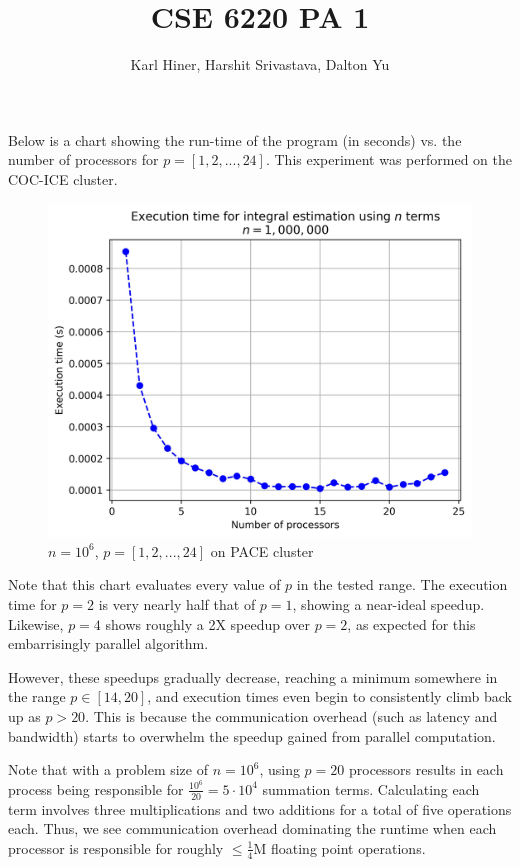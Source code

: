 \documentclass{article}
\begin{document}
\title{CSE 6220 PA 1}
\author{Karl Hiner, Harshit Srivastava, Dalton Yu}
\date{}
\maketitle

Below is a chart showing the run-time of the program (in seconds) vs. the number of processors for $p = [1,2,..., 24]$.
This experiment was performed on the COC-ICE cluster.

\begin{figure}[htb]
    \centering \includegraphics[width=\textwidth]{report_chart_n_1M_PACE.jpg}
    \caption{$n=10^6$, $p=[1,2,...,24]$ on PACE cluster}
    \label{fig:figure1}
\end{figure}

Note that this chart evaluates every value of $p$ in the tested range.
The execution time for $p = 2$ is very nearly half that of $p = 1$, showing a near-ideal speedup.
Likewise, $p = 4$ shows roughly a 2X speedup over $p = 2$, as expected for this embarrisingly parallel algorithm.

However, these speedups gradually decrease, reaching a minimum somewhere in the range $p \in [14, 20]$, and execution times even begin to consistently climb back up as $p > 20$.
This is because the communication overhead (such as latency and bandwidth) starts to overwhelm the speedup gained from parallel computation.

Note that with a problem size of $n=10^6$, using $p=20$ processors results in each process being responsible for $\frac{10^6}{20} = 5\cdot 10^4$ summation terms.
Calculating each term involves three multiplications and two additions for a total of five operations each.
Thus, we see communication overhead dominating the runtime when each processor is responsible for roughly $\leq \frac{1}{4}$M floating point operations.
\end{document}
